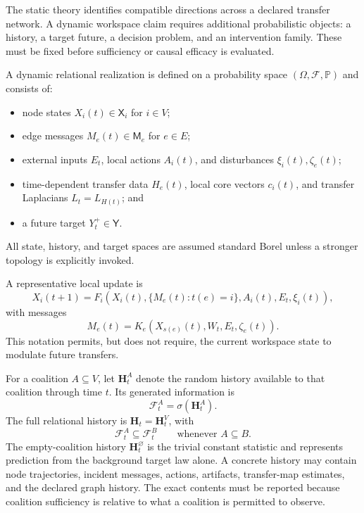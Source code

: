 

The static theory identifies compatible directions across a declared transfer
network. A dynamic workspace claim requires additional probabilistic objects:
a history, a target future, a decision problem, and an intervention family.
These must be fixed before sufficiency or causal efficacy is evaluated.

\begin{definition}\label{def:dynamic-realization}
A dynamic relational realization is defined on a probability space
\((\Omega,\mathcal F,\mathbb P)\) and consists of:
\begin{itemize}
\item node states \(X_i(t)\in\mathsf X_i\) for \(i\in V\);
\item edge messages \(M_e(t)\in\mathsf M_e\) for \(e\in E\);
\item external inputs \(E_t\), local actions \(A_i(t)\), and disturbances
 \(\xi_i(t),\zeta_e(t)\);
\item time-dependent transfer data \(H_e(t)\), local core vectors \(c_i(t)\),
 and transfer Laplacians \(L_t=L_{H(t)}\); and
\item a future target \(Y_t^+\in\mathsf Y\).
\end{itemize}
All state, history, and target spaces are assumed standard Borel unless a
stronger topology is explicitly invoked.
\end{definition}

A representative local update is
\[
X_i(t+1)
=
F_i\!\left(
X_i(t),
\{M_e(t):t(e)=i\},
A_i(t),E_t,\xi_i(t)
\right),
\]
with messages
\[
M_e(t)
=
K_e\!\left(
X_{s(e)}(t),
W_t,
E_t,\zeta_e(t)
\right).
\]
This notation permits, but does not require, the current workspace state to
modulate future transfers.

For a coalition \(A\subseteq V\), let \(\mathbf H_t^A\) denote the random
history available to that coalition through time \(t\). Its generated
information is
\[
\mathcal F_t^A=\sigma(\mathbf H_t^A).
\]
The full relational history is \(\mathbf H_t=\mathbf H_t^V\), with
\[
\mathcal F_t^A\subseteq\mathcal F_t^B
\qquad
\text{whenever }A\subseteq B.
\]
The empty-coalition history \(\mathbf H_t^\varnothing\) is the trivial
constant statistic and represents prediction from the background target law
alone.
A concrete history may contain node trajectories, incident messages, actions,
artifacts, transfer-map estimates, and the declared graph history. The exact
contents must be reported because coalition sufficiency is relative to what a
coalition is permitted to observe.

